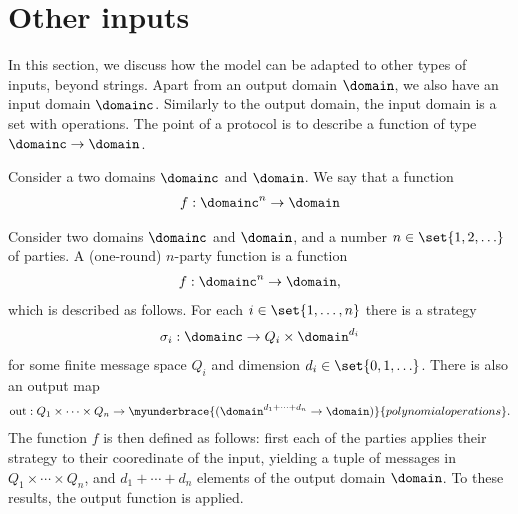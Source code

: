 \section{Other inputs}
\label{sec:other-inputs}
In this section, we discuss how the model can be adapted to other types of inputs, beyond strings. Apart from an output domain $\domain$, we also have an input domain $\domainc$. Similarly to the output domain, the input domain is a set with operations. The point of a protocol is to describe a function of type $\domainc \to \domain$. 



Consider a two domains $\domainc$ and $\domain$. We say that a function 
\begin{align*}
f : \domainc^n \to \domain
\end{align*}

\begin{definition}
    \label{def:multiparty-function}
    Consider two domains $\domainc$ and $\domain$, and a number $n \in \set{1,2,\ldots}$ of parties. 
    A  (one-round) $n$-party function is a function 
    \begin{align*}
f : \domainc^n \to \domain,
    \end{align*}
    which is described as follows. For each $i \in \set{1,\ldots,n}$ there is a  strategy
        \begin{align*}
        \sigma_i : \domainc \to Q_i \times \domain^{d_i}
        \end{align*}
for some finite message space $Q_i$ and dimension $d_i \in \set{0,1,\ldots}$. There is also an output map
\begin{align*}
\text{out} : Q_1 \times \cdots \times Q_n \to \myunderbrace{(\domain^{d_1 + \cdots + d_n} \to \domain)}{polynomial operations}.
\end{align*}   
The function $f$ is then defined as follows: first each of the parties applies their strategy to their cooredinate of the input, yielding a tuple of messages in $Q_1 \times \cdots \times Q_n$, and $d_1 + \cdots + d_n$ elements of  the output domain $\domain$. To these results, the output function is applied. 
\end{definition}




